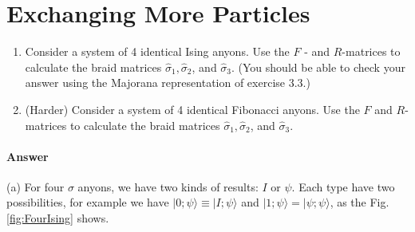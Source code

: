 \documentclass{book}
\begin{document}
\section{Exchanging More Particles}

\begin{enumerate}
\item Consider a system of 4 identical Ising anyons. Use the $F$ - and $R$-matrices to calculate the braid matrices $\hat{\sigma }_{1} ,\hat{\sigma }_{2}$, and $\hat{\sigma }_{3}$. (You should be able to check your answer using the Majorana representation of exercise 3.3.)
\item (Harder) Consider a system of 4 identical Fibonacci anyons. Use the $F$ and $R$-matrices to calculate the braid matrices $\hat{\sigma }_{1} ,\hat{\sigma }_{2}$, and $\hat{\sigma }_{3}$.
\end{enumerate}

\paragraph{Answer}
(a) For four $\sigma $ anyons, we have two kinds of results: $I$ or $\psi $. Each type have two possibilities, for example we have $|0;\psi \rangle \equiv |I;\psi \rangle $ and $|1;\psi \rangle =|\psi ;\psi \rangle $, as the Fig.\ref{fig:FourIsing} shows.
\end{document}
